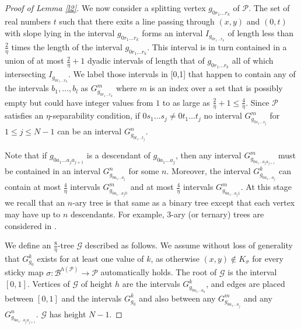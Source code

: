 \documentclass[12pt]{amsart}
\numberwithin{equation}{section}
\def\b#1{{\color{blue}#1}}
\theoremstyle{definition}
\theoremstyle{remark}
\def\b#1{{\color{blue}#1}}
\begin{document}
\begin{proof}[Proof of Lemma \ref{l2}]


We now consider a splitting vertex $g_{0r_1\ldots r_k}$ of $\mathscr{P}$.  The set of real numbers $t$ such that there exits a line passing through $(x,y)$ and $(0,t)$ with slope lying in the interval $g_{0r_1\ldots r_k}$ forms an interval $I_{g_{0r_1\ldots r_k}}$ of length less than $\frac{2}{\eta}$ times the length of the interval $g_{0r_1\ldots r_k}$.  This interval is in turn contained in a union of  at most $\frac{2}{\eta} + 1$ dyadic intervals of length that of $g_{0r_1\ldots r_k}$ all of which intersecting $I_{g_{0r_1\ldots r_k}}$.  We label those intervals in [0,1] that happen to contain any of the intervals $b_1, \ldots, b_l$  as $G^m_{g_{0r_1 \ldots r_k}}$ where $m$ is an index over a set that is possibly empty but could have integer values from $1$ to as large as $\frac{2}{\eta} + 1\leq \frac{4}{\eta}$.   Since $\mathscr{P}$ satisfies an $\eta$-separability condition, if $0s_1 \ldots s_j \neq 0t_1 \ldots t_j$ no interval  $G^m_{g_{0s_1 \ldots s_j}}$ for $1 \leq j \leq N-1$  can be an interval $G^n_{g_{0t_1 \ldots t_j}}$. 


  Note that if $g_{0a_1 \ldots a_j a_{j+1}}$ is a descendant of $g_{0a_1 \ldots a_j}$, then any interval $G^m_{g_{0a_1 \ldots a_j a_{j+1}}}$ must be contained in an interval  $G^n_{g_{0a_1 \ldots a_j}}$ for some $n$.    Moreover, the interval $G^k_{g_{0a_1 \ldots a_j}}$ can contain at most $\frac{4}{\eta}$ intervals  $G^m_{g_{0a_1 \ldots a_j 0}}$  and at most $\frac{4}{\eta}$ intervals  $G^m_{g_{0a_1 \ldots a_j 1}}$. 
At this stage we recall that an $n$-ary tree is that same as a binary tree except that each vertex may have up to $n$ descendants.   For example, 3-ary (or ternary) trees are considered  in \cite{KB}.

 We define an $\frac{8}{\eta}$-tree $\mathscr{G}$ described as follows.  We assume without loss of generality that $G^k_{g_0}$ exists for at least one value of $k$, as otherwise $(x,y) \notin K_\sigma$ for every sticky map $\sigma: \mathscr{B}^{h(\mathscr{P})} \rightarrow \mathscr{P}$ automatically holds.  The root of $\mathscr{G}$ is the interval $[0,1]$.  Vertices of $\mathscr{G}$ of height $h$ are the intervals $G^k_{g_{0a_1 \ldots a_h}}$, and edges are placed between $[0,1]$ and the intervals $G^k_{g_0}$ and also between any $G^m_{g_{0a_1 \ldots a_j}}$ and any  $G^n_{g_{0a_1 \ldots a_j a_{j+1}}}$.   $\mathscr{G}$ has height $N-1$.


\end{proof}
\end{document}
